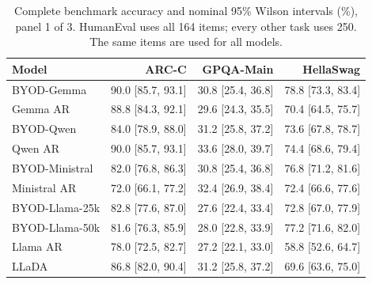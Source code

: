 \begin{table}[ht]
\caption{Complete benchmark accuracy and nominal 95\% Wilson intervals (\%), panel 1 of 3. HumanEval uses all 164 items; every other task uses 250. The same items are used for all models.}
\label{tab:benchmark-intervals-1}
\centering
\small
\begin{tabular}{lrrr}
\toprule
Model & ARC-C & GPQA-Main & HellaSwag \\
\midrule
BYOD-Gemma & 90.0 [85.7, 93.1] & 30.8 [25.4, 36.8] & 78.8 [73.3, 83.4] \\
Gemma AR & 88.8 [84.3, 92.1] & 29.6 [24.3, 35.5] & 70.4 [64.5, 75.7] \\
BYOD-Qwen & 84.0 [78.9, 88.0] & 31.2 [25.8, 37.2] & 73.6 [67.8, 78.7] \\
Qwen AR & 90.0 [85.7, 93.1] & 33.6 [28.0, 39.7] & 74.4 [68.6, 79.4] \\
BYOD-Ministral & 82.0 [76.8, 86.3] & 30.8 [25.4, 36.8] & 76.8 [71.2, 81.6] \\
Ministral AR & 72.0 [66.1, 77.2] & 32.4 [26.9, 38.4] & 72.4 [66.6, 77.6] \\
BYOD-Llama-25k & 82.8 [77.6, 87.0] & 27.6 [22.4, 33.4] & 72.8 [67.0, 77.9] \\
BYOD-Llama-50k & 81.6 [76.3, 85.9] & 28.0 [22.8, 33.9] & 77.2 [71.6, 82.0] \\
Llama AR & 78.0 [72.5, 82.7] & 27.2 [22.1, 33.0] & 58.8 [52.6, 64.7] \\
LLaDA & 86.8 [82.0, 90.4] & 31.2 [25.8, 37.2] & 69.6 [63.6, 75.0] \\
\bottomrule
\end{tabular}
\end{table}

